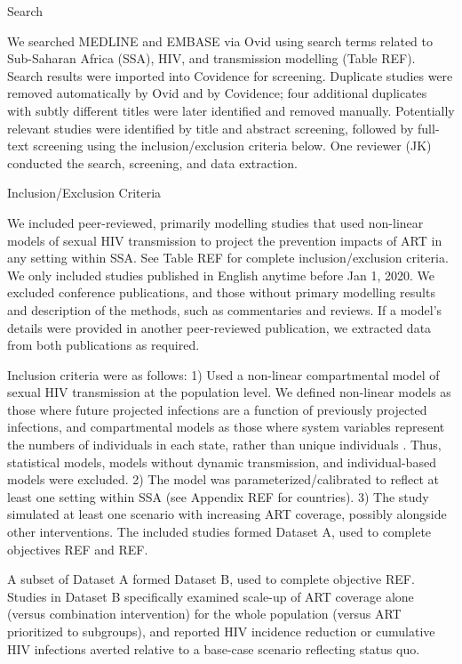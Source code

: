Search

We searched MEDLINE and EMBASE via Ovid
using search terms related to Sub-Saharan Africa (SSA), HIV, and transmission modelling
(Table REF).
Search results were imported into Covidence \cite{Covidence} for screening.
Duplicate studies were removed automatically by Ovid and by Covidence;
four additional duplicates with subtly different titles were later identified and removed manually.
Potentially relevant studies were identified by title and abstract screening, followed 
by full-text screening using the inclusion/exclusion criteria below. 
One reviewer (JK) conducted the search, screening, and data extraction.

Inclusion/Exclusion Criteria

We included peer-reviewed, primarily modelling studies that used non-linear models of sexual HIV transmission
to project the prevention impacts of ART in any setting within SSA.
See Table REF for complete inclusion/exclusion criteria.
We only included studies published in English anytime before Jan 1, 2020.
We excluded conference publications, and those without primary modelling results and description of the methods,
such as commentaries and reviews.
If a model's details were provided in another peer-reviewed publication,
we extracted data from both publications as required.

Inclusion criteria were as follows:
1) Used a non-linear compartmental model of sexual HIV transmission at the population level.
We defined non-linear models as those where
future projected infections are a function of previously projected infections,
and compartmental models as those where
system variables represent the numbers of individuals in each state,
rather than unique individuals \cite{Garnett2011}.
Thus, statistical models, models without dynamic transmission, and individual-based models were excluded.
2) The model was parameterized/calibrated to reflect at least one setting within SSA
(see Appendix REF for countries).
3) The study simulated at least one scenario with increasing ART coverage,
possibly alongside other interventions.
The included studies formed Dataset A,
used to complete objectives REF and REF.

A subset of Dataset A formed Dataset B,
used to complete objective REF.
Studies in Dataset B specifically examined
scale-up of ART coverage alone (versus combination intervention)
for the whole population (versus ART prioritized to subgroups),
and reported HIV incidence reduction or cumulative HIV infections averted
relative to a base-case scenario reflecting status quo.


